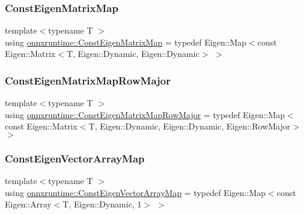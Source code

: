 \mbox{\label{namespaceonnxruntime_af661f4597d8e5ee0845a113e47e058a1}} 
\subsubsection{\texorpdfstring{Const\+Eigen\+Matrix\+Map}{ConstEigenMatrixMap}}
{\footnotesize\ttfamily template$<$typename T $>$ \\
using \mbox{\hyperlink{namespaceonnxruntime_af661f4597d8e5ee0845a113e47e058a1}{onnxruntime\+::\+Const\+Eigen\+Matrix\+Map}} = typedef Eigen\+::\+Map$<$const Eigen\+::\+Matrix$<$T, Eigen\+::\+Dynamic, Eigen\+::\+Dynamic$>$ $>$}

\mbox{\label{namespaceonnxruntime_ab8ec943c43d4f1616dd0631f0087b982}} 
\subsubsection{\texorpdfstring{Const\+Eigen\+Matrix\+Map\+Row\+Major}{ConstEigenMatrixMapRowMajor}}
{\footnotesize\ttfamily template$<$typename T $>$ \\
using \mbox{\hyperlink{namespaceonnxruntime_ab8ec943c43d4f1616dd0631f0087b982}{onnxruntime\+::\+Const\+Eigen\+Matrix\+Map\+Row\+Major}} = typedef Eigen\+::\+Map$<$ const Eigen\+::\+Matrix$<$T, Eigen\+::\+Dynamic, Eigen\+::\+Dynamic, Eigen\+::\+Row\+Major$>$ $>$}

\mbox{\label{namespaceonnxruntime_ac7a9414de27efeec981dc0da42af0857}} 
\subsubsection{\texorpdfstring{Const\+Eigen\+Vector\+Array\+Map}{ConstEigenVectorArrayMap}}
{\footnotesize\ttfamily template$<$typename T $>$ \\
using \mbox{\hyperlink{namespaceonnxruntime_ac7a9414de27efeec981dc0da42af0857}{onnxruntime\+::\+Const\+Eigen\+Vector\+Array\+Map}} = typedef Eigen\+::\+Map$<$const Eigen\+::\+Array$<$T, Eigen\+::\+Dynamic, 1$>$ $>$}

